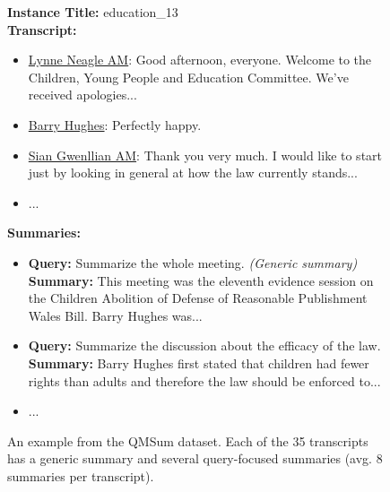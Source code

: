 \begin{figure*}[t]
    \centering
    \begin{tcolorbox}[
      title=QMSum Example,
      colframe=blue!50!black,
      colback=blue!5!white,
      coltitle=white,
      fonttitle=\bfseries,
      boxrule=0.5mm,
      width=\textwidth,
      sharp corners%
    ]

    \textbf{Instance Title:} education\_13 \\

    \textbf{Transcript:}
    \begin{itemize}
      \item \underline{Lynne Neagle AM}: Good afternoon, everyone. Welcome to the Children, Young People and Education Committee. We've received apologies...
      \item \underline{Barry Hughes}: Perfectly happy.
      \item \underline{Sian Gwenllian AM}: Thank you very much. I would like to start just by looking in general at how the law currently stands...
      \item ...
    \end{itemize}

    \vspace{0.5em}

    \textbf{Summaries:} 
    \begin{itemize}
        \item \textbf{Query:} Summarize the whole meeting. \textit{(Generic summary)}\\
        \textbf{Summary:} This meeting was the eleventh evidence session on the Children Abolition of Defense of Reasonable Publishment Wales Bill. Barry Hughes was...
        \item \textbf{Query:} Summarize the discussion about the efficacy of the law.\\
        \textbf{Summary:} Barry Hughes first stated that children had fewer rights than adults and therefore the law should be enforced to...
        \item ...
    \end{itemize}

    \end{tcolorbox}
    \caption{An example from the QMSum dataset. Each of the 35 transcripts has a generic summary and several query-focused summaries (avg. 8 summaries per transcript).}
    \label{fig_qmsum_example}
\end{figure*}